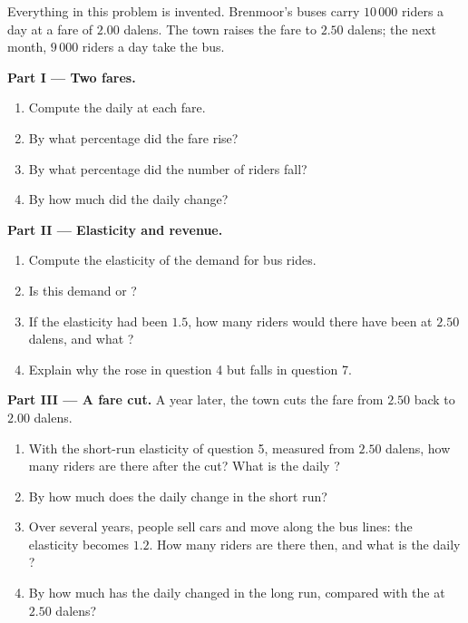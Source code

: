 \begin{problem}
\label{pb:g9:elasticity-first-look:1}
Everything in this problem is invented. Brenmoor's buses carry $10\,000$ riders a day at a fare of
$2.00$ dalens. The town raises the fare to $2.50$ dalens; the next month, $9\,000$ riders a day take the
bus.

\medskip
\noindent\textbf{Part I --- Two fares.}
\begin{enumerate}
  \item Compute the daily  at each fare.
  \item By what percentage did the fare rise?
  \item By what percentage did the number of riders fall?
  \item By how much did the daily  change?
\end{enumerate}

\medskip
\noindent\textbf{Part II --- Elasticity and revenue.}
\begin{enumerate}[resume]
  \item Compute the elasticity of the demand for bus rides.
  \item Is this demand  or ?
  \item If the elasticity had been $1.5$, how many riders would there have been at $2.50$ dalens, and what
        ?
  \item Explain why the  rose in question 4 but falls in question 7.
\end{enumerate}

\medskip
\noindent\textbf{Part III --- A fare cut.} A year later, the town cuts the fare from $2.50$ back to $2.00$
dalens.
\begin{enumerate}[resume]
  \item With the short-run elasticity of question 5, measured from $2.50$ dalens, how many riders are there
        after the cut? What is the daily ?
  \item By how much does the daily  change in the short run?
  \item Over several years, people sell cars and move along the bus lines: the elasticity becomes $1.2$.
        How many riders are there then, and what is the daily ?
  \item By how much has the daily  changed in the long run, compared with the  at $2.50$
        dalens?
\end{enumerate}
\end{problem}

